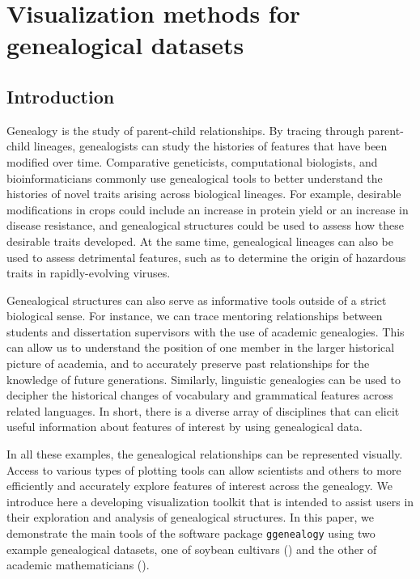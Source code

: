 \documentclass[11pt,a4paper,oldfontcommands,openany]{memoir}
\numberwithin{equation}{section} %
\newcommand{\pkg}[1]{{\texttt{#1}}}
\begin{document}
 
\chapter{Visualization methods for genealogical datasets}
\label{sec:chapter1}

\section{Introduction}

Genealogy is the study of parent-child relationships. By tracing through parent-child lineages, genealogists can study the histories of features that have been modified over time. Comparative geneticists, computational biologists, and bioinformaticians commonly use genealogical tools to better understand the histories of novel traits arising across biological lineages. For example, desirable modifications in crops could include an increase in protein yield or an increase in disease resistance, and genealogical structures could be used to assess how these desirable traits developed. At the same time, genealogical lineages can also be used to assess detrimental features, such as to determine the origin of hazardous traits in rapidly-evolving viruses.

Genealogical structures can also serve as informative tools outside of a strict biological sense. For instance, we can trace mentoring relationships between students and dissertation supervisors with the use of academic genealogies. This can allow us to understand the position of one member in the larger historical picture of academia, and to accurately preserve past relationships for the knowledge of future generations. Similarly, linguistic genealogies can be used to decipher the historical changes of vocabulary and grammatical features across related languages. In short, there is a diverse array of disciplines that can elicit useful information about features of interest by using genealogical data.

In all these examples, the genealogical relationships can be represented visually. Access to various types of plotting tools can allow scientists and others to more efficiently and accurately explore features of interest across the genealogy. We introduce here a developing visualization toolkit that is intended to assist users in their exploration and analysis of genealogical structures. In this paper, we demonstrate the main tools of the software package \pkg{ggenealogy} using two example genealogical datasets, one of soybean cultivars (\citealt{soybean}) and the other of academic mathematicians (\citealt{mgp}).
\end{document}

